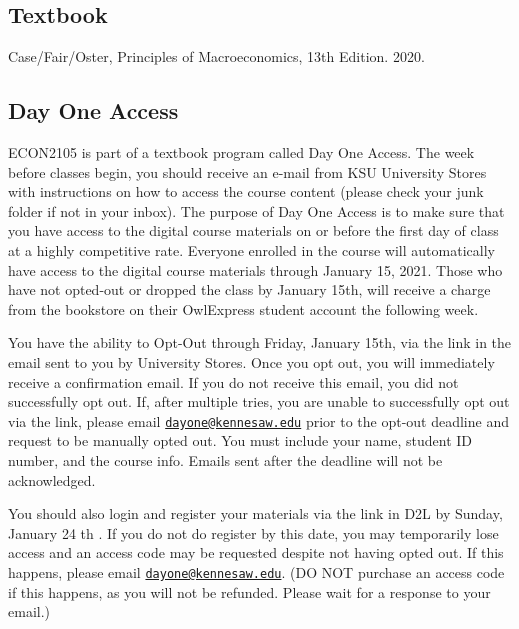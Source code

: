 \documentclass[11pt,]{article}
\begin{document}
\hypertarget{textbook}{%
\subsection{Textbook}\label{textbook}}

Case/Fair/Oster, Principles of Macroeconomics, 13th Edition. 2020.

\hypertarget{day-one-access}{%
\subsection*{Day One Access}\label{day-one-access}}

ECON2105 is part of a textbook program called Day One Access. The week before
classes begin, you should receive an e-mail from KSU University Stores with instructions on how
to access the course content (please check your junk folder if not in your inbox). The purpose of
Day One Access is to make sure that you have access to the digital course materials on or before
the first day of class at a highly competitive rate. Everyone enrolled in the course will
automatically have access to the digital course materials through January 15, 2021. Those who
have not opted-out or dropped the class by January 15th, will receive a charge from the
bookstore on their OwlExpress student account the following week.

You have the ability to Opt-Out through Friday, January 15th, via the link in the email sent to you
by University Stores. Once you opt out, you will immediately receive a confirmation email. If you
do not receive this email, you did not successfully opt out. If, after multiple tries, you are unable
to successfully opt out via the link, please email \href{mailto:dayone@kennesaw.edu}{\nolinkurl{dayone@kennesaw.edu}} prior to the opt-out
deadline and request to be manually opted out. You must include your name, student ID number,
and the course info. Emails sent after the deadline will not be acknowledged.

You should also login and register your materials via the link in D2L by Sunday, January 24 th . If you
do not do register by this date, you may temporarily lose access and an access code may be
requested despite not having opted out. If this happens, please email \href{mailto:dayone@kennesaw.edu}{\nolinkurl{dayone@kennesaw.edu}}.
(DO NOT purchase an access code if this happens, as you will not be refunded. Please wait for a
response to your email.)
\end{document}
